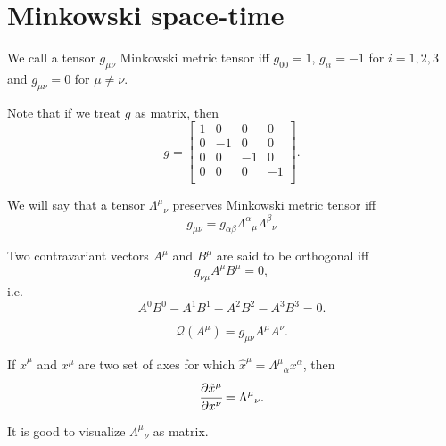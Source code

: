 \documentclass[main.tex]{subfiles}
\begin{document}
\section{Minkowski space-time}
\begin{definition}
We call a tensor $g_{\mu\nu}$ Minkowski metric tensor iff
$g_{00} = 1$, $g_{ii} = -1$ for $i=1,2,3$ and $g_{\mu\nu} = 0$ for $\mu\not=\nu$.
\end{definition}

Note that if we treat $g$ as matrix, then
\begin{equation}
g = 
\begin{bmatrix}
1 & 0 & 0 & 0 \\
0 & -1 & 0 & 0 \\
0 & 0 & -1 & 0 \\
0 & 0 & 0 & -1 \\
\end{bmatrix}.
\end{equation}
\begin{definition}
We will say that a tensor ${\Lambda^\mu}_\nu$ preserves Minkowski metric tensor iff
\begin{equation}
    g_{\mu\nu} = g_{\alpha\beta} {\Lambda^\alpha}_\mu{\Lambda^\beta}_\nu
\end{equation}
\end{definition}
\begin{definition}
Two contravariant vectors $A^\mu$ and $B^\mu$ are said to be orthogonal iff
\begin{equation}
    g_{\nu\mu}A^\mu B^\mu = 0,
\end{equation}
i.e.
\begin{equation}
    A^0B^0 - A^1B^1 - A^2B^2 - A^3B^3 = 0.
\end{equation}
\end{definition}
\begin{definition}
\begin{equation}
    \mathcal{Q}(A^\mu) =  g_{\mu\nu}A^\mu A^\nu.
\end{equation}
\end{definition}
\begin{lemma}
If  $\hat{x}^\mu$ and $x^\mu$ are two set of axes for which $\hat{x}^\mu = {\Lambda^\mu}_\alpha x^\alpha$, then
\begin{equation}
    \cfrac{\partial \hat{x}^\mu}{\partial x^\nu} =  {\Lambda^\mu}_\nu.
\end{equation}

\end{lemma}
It is good to visualize ${\Lambda^\mu}_\nu$ as matrix.
\end{document}

